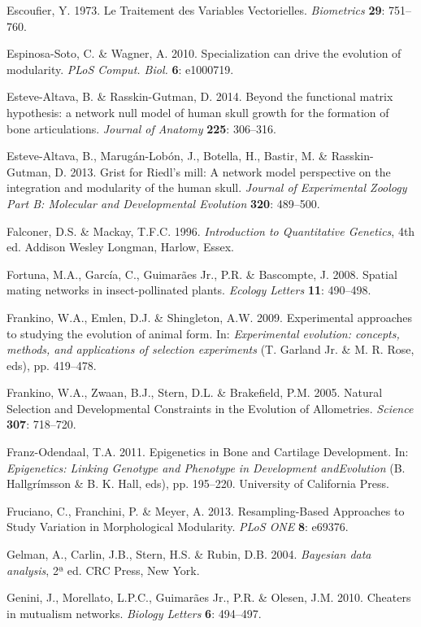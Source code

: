 \documentclass[12pt,twoside]{report}
\begin{document}
Escoufier, Y. 1973. Le Traitement des Variables Vectorielles.
\emph{Biometrics} \textbf{29}: 751--760.

Espinosa-Soto, C. \& Wagner, A. 2010. Specialization can drive the
evolution of modularity. \emph{PLoS Comput. Biol.} \textbf{6}: e1000719.

Esteve-Altava, B. \& Rasskin-Gutman, D. 2014. Beyond the functional
matrix hypothesis: a network null model of human skull growth for the
formation of bone articulations. \emph{Journal of Anatomy} \textbf{225}:
306--316.

Esteve-Altava, B., Marugán-Lobón, J., Botella, H., Bastir, M. \&
Rasskin-Gutman, D. 2013. Grist for Riedl's mill: A network model
perspective on the integration and modularity of the human skull.
\emph{Journal of Experimental Zoology Part B: Molecular and
Developmental Evolution} \textbf{320}: 489--500.

Falconer, D.S. \& Mackay, T.F.C. 1996. \emph{Introduction to
Quantitative Genetics}, 4th ed. Addison Wesley Longman, Harlow, Essex.

Fortuna, M.A., García, C., Guimarães Jr., P.R. \& Bascompte, J. 2008.
Spatial mating networks in insect-pollinated plants. \emph{Ecology
Letters} \textbf{11}: 490--498.

Frankino, W.A., Emlen, D.J. \& Shingleton, A.W. 2009. Experimental
approaches to studying the evolution of animal form. In:
\emph{Experimental evolution: concepts, methods, and applications of
selection experiments} (T. Garland Jr. \& M. R. Rose, eds), pp.
419--478.

Frankino, W.A., Zwaan, B.J., Stern, D.L. \& Brakefield, P.M. 2005.
Natural Selection and Developmental Constraints in the Evolution of
Allometries. \emph{Science} \textbf{307}: 718--720.

Franz-Odendaal, T.A. 2011. Epigenetics in Bone and Cartilage
Development. In: \emph{Epigenetics: Linking Genotype and Phenotype in
Development andEvolution} (B. Hallgrímsson \& B. K. Hall, eds), pp.
195--220. University of California Press.

Fruciano, C., Franchini, P. \& Meyer, A. 2013. Resampling-Based
Approaches to Study Variation in Morphological Modularity. \emph{PLoS
ONE} \textbf{8}: e69376.

Gelman, A., Carlin, J.B., Stern, H.S. \& Rubin, D.B. 2004.
\emph{Bayesian data analysis}, 2ª ed. CRC Press, New York.

Genini, J., Morellato, L.P.C., Guimarães Jr., P.R. \& Olesen, J.M. 2010.
Cheaters in mutualism networks. \emph{Biology Letters} \textbf{6}:
494--497.
\end{document}

